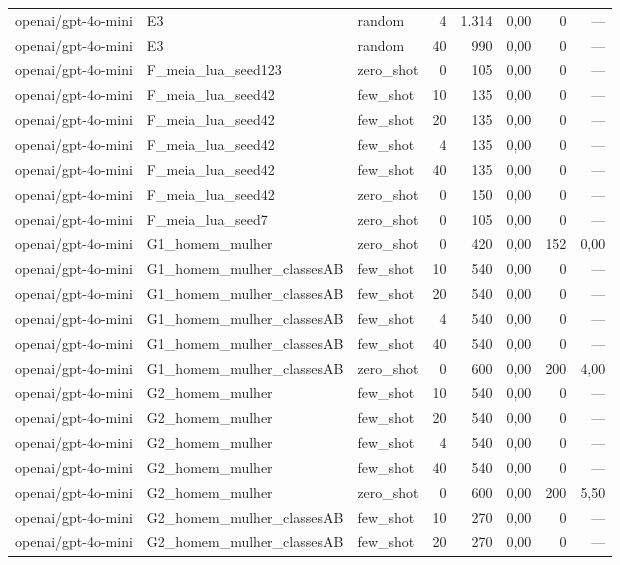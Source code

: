 \begin{table}[htbp]
\begin{tabular}{lllrrrrr}
openai/gpt-4o-mini & E3 & random & 4 & 1.314 & 0,00 & 0 & — \\
openai/gpt-4o-mini & E3 & random & 40 & 990 & 0,00 & 0 & — \\
openai/gpt-4o-mini & F\_meia\_lua\_seed123 & zero\_shot & 0 & 105 & 0,00 & 0 & — \\
openai/gpt-4o-mini & F\_meia\_lua\_seed42 & few\_shot & 10 & 135 & 0,00 & 0 & — \\
openai/gpt-4o-mini & F\_meia\_lua\_seed42 & few\_shot & 20 & 135 & 0,00 & 0 & — \\
openai/gpt-4o-mini & F\_meia\_lua\_seed42 & few\_shot & 4 & 135 & 0,00 & 0 & — \\
openai/gpt-4o-mini & F\_meia\_lua\_seed42 & few\_shot & 40 & 135 & 0,00 & 0 & — \\
openai/gpt-4o-mini & F\_meia\_lua\_seed42 & zero\_shot & 0 & 150 & 0,00 & 0 & — \\
openai/gpt-4o-mini & F\_meia\_lua\_seed7 & zero\_shot & 0 & 105 & 0,00 & 0 & — \\
openai/gpt-4o-mini & G1\_homem\_mulher & zero\_shot & 0 & 420 & 0,00 & 152 & 0,00 \\
openai/gpt-4o-mini & G1\_homem\_mulher\_classesAB & few\_shot & 10 & 540 & 0,00 & 0 & — \\
openai/gpt-4o-mini & G1\_homem\_mulher\_classesAB & few\_shot & 20 & 540 & 0,00 & 0 & — \\
openai/gpt-4o-mini & G1\_homem\_mulher\_classesAB & few\_shot & 4 & 540 & 0,00 & 0 & — \\
openai/gpt-4o-mini & G1\_homem\_mulher\_classesAB & few\_shot & 40 & 540 & 0,00 & 0 & — \\
openai/gpt-4o-mini & G1\_homem\_mulher\_classesAB & zero\_shot & 0 & 600 & 0,00 & 200 & 4,00 \\
openai/gpt-4o-mini & G2\_homem\_mulher & few\_shot & 10 & 540 & 0,00 & 0 & — \\
openai/gpt-4o-mini & G2\_homem\_mulher & few\_shot & 20 & 540 & 0,00 & 0 & — \\
openai/gpt-4o-mini & G2\_homem\_mulher & few\_shot & 4 & 540 & 0,00 & 0 & — \\
openai/gpt-4o-mini & G2\_homem\_mulher & few\_shot & 40 & 540 & 0,00 & 0 & — \\
openai/gpt-4o-mini & G2\_homem\_mulher & zero\_shot & 0 & 600 & 0,00 & 200 & 5,50 \\
openai/gpt-4o-mini & G2\_homem\_mulher\_classesAB & few\_shot & 10 & 270 & 0,00 & 0 & — \\
openai/gpt-4o-mini & G2\_homem\_mulher\_classesAB & few\_shot & 20 & 270 & 0,00 & 0 & — \\

\end{tabular}
\end{table}
